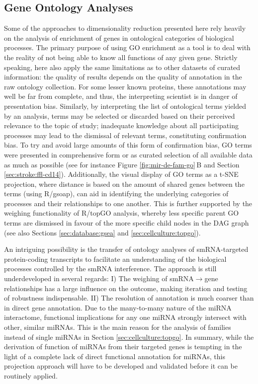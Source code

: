 \subsection{Gene Ontology Analyses} \label{sec:discussion:go}
Some of the approaches to dimensionality reduction presented here rely heavily on the analysis of enrichment of genes in ontological categories of biological processes. The primary purpose of using GO enrichment as a tool is to deal with the reality of not being able to know all functions of any given gene. Strictly speaking, here also apply the same limitations as to other datasets of curated information: the quality of results depends on the quality of annotation in the raw ontology collection. For some lesser known proteins, these annotations may well be far from complete, and thus, the interpreting scientist is in danger of presentation bias. Similarly, by interpreting the list of ontological terms yielded by an analysis, terms may be selected or discarded based on their perceived relevance to the topic of study; inadequate knowledge about all participating processes may lead to the dismissal of relevant terms, constituting confirmation bias. To try and avoid large amounts of this form of confirmation bias, GO terms were presented in comprehensive form or as curated selection of all available data as much as possible (see for instance Figure \ref{fig:mir-de-fam-go}\,B and Section \ref{sec:stroke:ffl-cd14}). Additionally, the visual display of GO terms as a t-SNE projection, where distance is based on the amount of shared genes between the terms (using R/gsoap\cite{Tokar2020}), can aid in identifying the underlying categories of processes and their relationships to one another. This is further supported by the weighing functionality of R/topGO analysis,\cite{Alexa2006} whereby less specific parent GO terms are dismissed in favour of the more specific child nodes in the DAG graph (see also Sections \ref{sec:database:gsea} and \ref{sec:cellculture:topgo}).

An intriguing possibility is the transfer of ontology analyses of smRNA-targeted protein-coding transcripts to facilitate an understanding of the biological processes controlled by the smRNA interference. The approach is still underdeveloped in several regards: I) The weighing of smRNA$\to$gene relationships has a large influence on the outcome, making iteration and testing of robustness indispensable. II) The resolution of annotation is much coarser than in direct gene annotation. Due to the many-to-many nature of the miRNA interactome, functional implications for any one miRNA strongly intersect with other, similar miRNAs. This is the main reason for the analysis of families instead of single miRNAs in Section \ref{sec:cellculture:topgo}. In summary, while the derivation of function of miRNAs from their targeted genes is tempting in the light of a complete lack of direct functional annotation for miRNAs, this projection approach will have to be developed and validated before it can be routinely applied.

